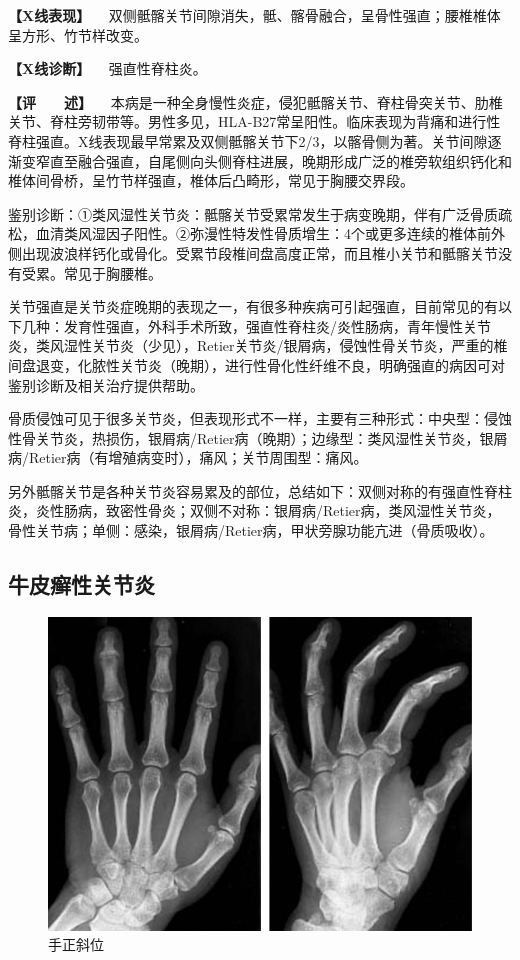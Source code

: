 \textbf{【X线表现】}
　双侧骶髂关节间隙消失，骶、髂骨融合，呈骨性强直；腰椎椎体呈方形、竹节样改变。

\textbf{【X线诊断】} 　强直性脊柱炎。

\textbf{【评　　述】}
　本病是一种全身慢性炎症，侵犯骶髂关节、脊柱骨突关节、肋椎关节、脊柱旁韧带等。男性多见，HLA-B27常呈阳性。临床表现为背痛和进行性脊柱强直。X线表现最早常累及双侧骶髂关节下2/3，以髂骨侧为著。关节间隙逐渐变窄直至融合强直，自尾侧向头侧脊柱进展，晚期形成广泛的椎旁软组织钙化和椎体间骨桥，呈竹节样强直，椎体后凸畸形，常见于胸腰交界段。

鉴别诊断：①类风湿性关节炎：骶髂关节受累常发生于病变晚期，伴有广泛骨质疏松，血清类风湿因子阳性。②弥漫性特发性骨质增生：4个或更多连续的椎体前外侧出现波浪样钙化或骨化。受累节段椎间盘高度正常，而且椎小关节和骶髂关节没有受累。常见于胸腰椎。

关节强直是关节炎症晚期的表现之一，有很多种疾病可引起强直，目前常见的有以下几种：发育性强直，外科手术所致，强直性脊柱炎/炎性肠病，青年慢性关节炎，类风湿性关节炎（少见），Retier关节炎/银屑病，侵蚀性骨关节炎，严重的椎间盘退变，化脓性关节炎（晚期），进行性骨化性纤维不良，明确强直的病因可对鉴别诊断及相关治疗提供帮助。

骨质侵蚀可见于很多关节炎，但表现形式不一样，主要有三种形式：中央型：侵蚀性骨关节炎，热损伤，银屑病/Retier病（晚期）；边缘型：类风湿性关节炎，银屑病/Retier病（有增殖病变时），痛风；关节周围型：痛风。

另外骶髂关节是各种关节炎容易累及的部位，总结如下：双侧对称的有强直性脊柱炎，炎性肠病，致密性骨炎；双侧不对称：银屑病/Retier病，类风湿性关节炎，骨性关节病；单侧：感染，银屑病/Retier病，甲状旁腺功能亢进（骨质吸收）。

\subsection{牛皮癣性关节炎}

\begin{figure}[!htbp]
 \centering
 \includegraphics{./images/Image00118.jpg}
 \captionsetup{justification=centering}
 \caption{手正斜位}
 \label{fig2-8-4}
  \end{figure} 

